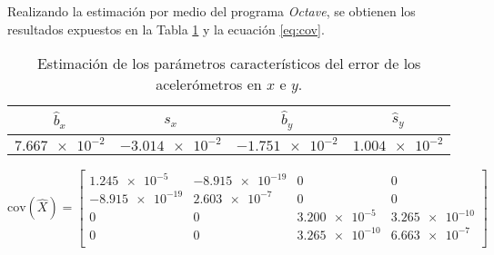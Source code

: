 		Realizando la estimación por medio del programa \emph{Octave}, se obtienen los resultados expuestos en la Tabla \ref{tab:ej2} y la ecuación \eqref{eq:cov}.
	\begin{table}[h!]
		\centering
		\begin{tabular}{cccc}
			\toprule
			$\hat{b}_x$	&$\hat{s}_x$		&$\hat{b}_y$	&$\hat{s}_y$\\
			\midrule
			$\num{7.667e-2}$	&$\num{-3.014e-2}$	&$\num{-1.751e-2}$	&$\num{1.004e-2}$\\
			\bottomrule
		\end{tabular}
		\caption{Estimación de los parámetros característicos del error de los acelerómetros en $x$ e $y$.}
		\label{tab:ej2}
	\end{table}

	\begin{equation}
		\text{cov}(\hat{X}) = \begin{bmatrix} \num{1.245e-5}&\num{-8.915e-19}&0&0\\\num{-8.915e-19}&\num{2.603e-7}&0&0\\ 0&0&\num{3.200e-5} & \num{3.265e-10}\\ 0&0&\num{3.265e-10} & \num{6.663e-7}\\\end{bmatrix}
		\label{eq:cov}
	\end{equation}
